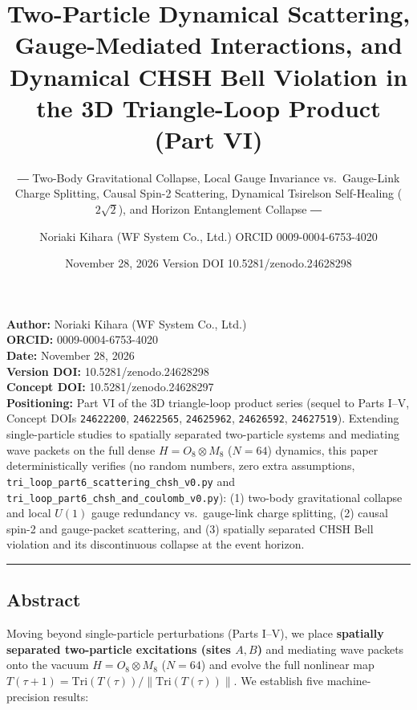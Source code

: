 \documentclass[
  a4paper,
]{article}
\title{Two-Particle Dynamical Scattering, Gauge-Mediated Interactions,
and Dynamical CHSH Bell Violation in the 3D Triangle-Loop Product (Part
VI)}
\subtitle{― Two-Body Gravitational Collapse, Local Gauge Invariance
vs.~Gauge-Link Charge Splitting, Causal Spin-2 Scattering, Dynamical
Tsirelson Self-Healing (\(2\sqrt{2}\)), and Horizon Entanglement
Collapse ―}
\author{Noriaki Kihara (WF System Co., Ltd.) ORCID 0009-0004-6753-4020}
\date{November 28, 2026 Version DOI 10.5281/zenodo.24628298}
\begin{document}
\maketitle

{
\setcounter{tocdepth}{2}
\tableofcontents
}
\textbf{Author:} Noriaki Kihara (WF System Co., Ltd.)\\
\textbf{ORCID:} 0009-0004-6753-4020\\
\textbf{Date:} November 28, 2026\\
\textbf{Version DOI:} 10.5281/zenodo.24628298\\
\textbf{Concept DOI:} 10.5281/zenodo.24628297\\
\textbf{Positioning:} Part VI of the 3D triangle-loop product series
(sequel to Parts I--V, Concept DOIs \texttt{24622200},
\texttt{24622565}, \texttt{24625962}, \texttt{24626592},
\texttt{24627519}). Extending single-particle studies to spatially
separated two-particle systems and mediating wave packets on the full
dense \(H = O_8 \otimes M_8\) (\(N = 64\)) dynamics, this paper
deterministically verifies (no random numbers, zero extra assumptions,
\texttt{tri\_loop\_part6\_scattering\_chsh\_v0.py} and
\texttt{tri\_loop\_part6\_chsh\_and\_coulomb\_v0.py}): (1) two-body
gravitational collapse and local \(U(1)\) gauge redundancy
vs.~gauge-link charge splitting, (2) causal spin-2 and gauge-packet
scattering, and (3) spatially separated CHSH Bell violation and its
discontinuous collapse at the event horizon.

\begin{center}\rule{0.5\linewidth}{0.5pt}\end{center}

\subsection{Abstract}\label{abstract}

Moving beyond single-particle perturbations (Parts I--V), we place
\textbf{spatially separated two-particle excitations (sites \(A, B\))}
and mediating wave packets onto the vacuum \(H = O_8 \otimes M_8\)
(\(N = 64\)) and evolve the full nonlinear map
\(T(\tau+1) = \mathrm{Tri}(T(\tau)) / \|\mathrm{Tri}(T(\tau))\|\). We
establish five machine-precision results:
\end{document}
